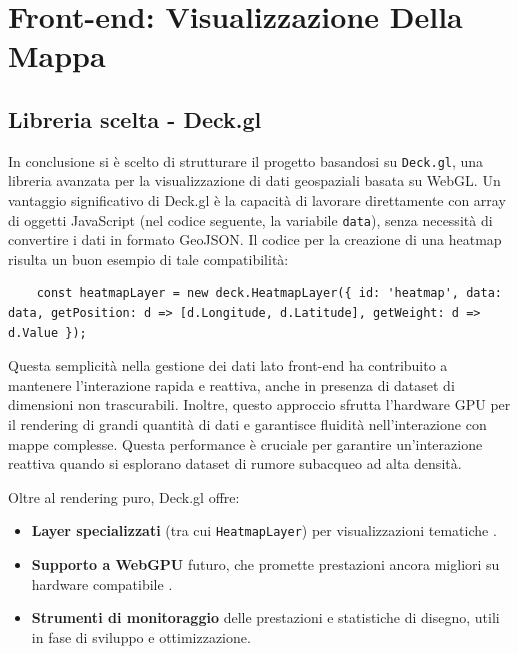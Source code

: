 \section{Front-end: Visualizzazione Della Mappa}
\label{ch:frontend-advanced}

\subsection{Libreria scelta - Deck.gl}

In conclusione si è scelto di strutturare il progetto basandosi su \texttt{Deck.gl},
una libreria avanzata per la visualizzazione di dati geospaziali basata su WebGL.
Un vantaggio significativo di Deck.gl è la capacità di lavorare direttamente con
array di oggetti JavaScript (nel codice seguente, la variabile \texttt{data}),
senza necessità di convertire i dati in formato GeoJSON. \cite{deckgl-heatmap} Il
codice per la creazione di una heatmap risulta un buon esempio di tale compatibilità:

\begin{listing}
  [H]
  \caption{Integrazione dati flat con Deck.gl}
  \label{lst:deckgl_heatmap_layer} %
  \begin{verbatim}
    const heatmapLayer = new deck.HeatmapLayer({ id: 'heatmap', data: data, getPosition: d => [d.Longitude, d.Latitude], getWeight: d => d.Value });
  \end{verbatim}
\end{listing}

Questa semplicità nella gestione dei dati lato front-end ha contribuito a
mantenere l'interazione rapida e reattiva, anche in presenza di dataset di dimensioni
non trascurabili. Inoltre, questo approccio sfrutta l'hardware GPU per il rendering
di grandi quantità di dati e garantisce fluidità nell'interazione con mappe complesse.
Questa performance è cruciale per garantire un'interazione reattiva quando si
esplorano dataset di rumore subacqueo ad alta densità. \cite{deckgl-heatmap}

Oltre al rendering puro, Deck.gl offre:
\begin{itemize}
  \item \textbf{Layer specializzati} (tra cui \texttt{HeatmapLayer}) per visualizzazioni
    tematiche \cite{deckgl-docs}.

  \item \textbf{Supporto a WebGPU} futuro, che promette prestazioni ancora migliori
    su hardware compatibile \cite{deckgl-roadmap}.

  \item \textbf{Strumenti di monitoraggio} delle prestazioni e statistiche di
    disegno, utili in fase di sviluppo e ottimizzazione.
\end{itemize}

